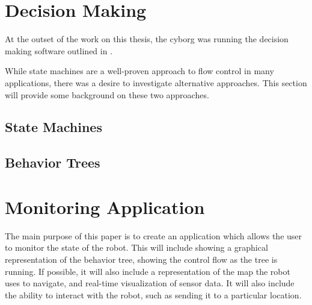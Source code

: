 \documentclass[\rootfolder/main.tex]{subfiles}
\begin{document}
\section{Decision Making}

At the outset of the work on this thesis, the cyborg was running the decision making software outlined in \cite{Andersen2017}.

While state machines are a well-proven approach to flow control in many applications, there was a desire to investigate alternative approaches.
This section will provide some background on these two approaches.

\subsection{State Machines} \label{sec:statemachines}


\subsection{Behavior Trees} \label{sec:behaviortrees}


\section{Monitoring Application}

The main purpose of this paper is to create an application which allows the user to monitor the state of the robot.
This will include showing a graphical representation of the behavior tree, showing the control flow as the tree is running.
If possible, it will also include a representation of the map the robot uses to navigate, and real-time visualization of sensor data.
It will also include the ability to interact with the robot, such as sending it to a particular location.
\end{document}
